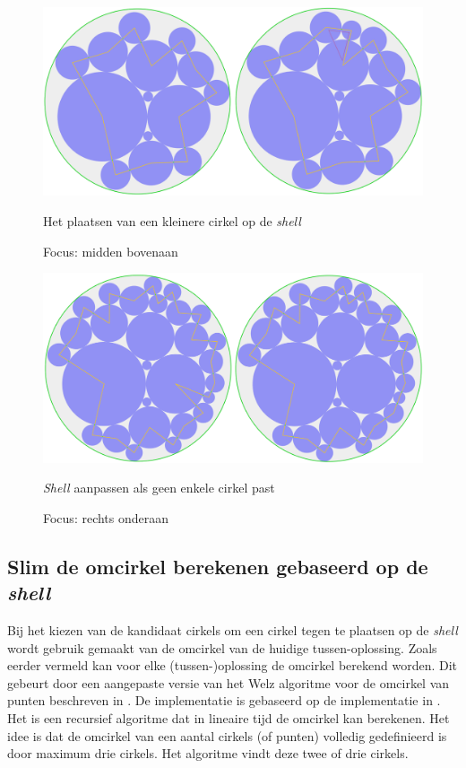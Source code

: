 \documentclass[12pt,a4paper,oneside]{book}
\begin{document}
\begin{figure}
  \centering
  \includegraphics[width=1.0\textwidth]{plaats-op-shell-kleiner.png}
  \caption{Het plaatsen van een kleinere cirkel op de \textit{shell}} \label{fig:plaats-op-shell-kleiner} 
  \caption*{Focus: midden bovenaan}
\end{figure}

\begin{figure}
  \centering
  \includegraphics[width=1.0\textwidth]{plaats-op-shell-geen-enkele-past.png}
  \caption{\textit{Shell} aanpassen als geen enkele cirkel past} \label{fig:plaats-op-shell-geen-enkele-past} 
  \caption*{Focus: rechts onderaan}
\end{figure}

\subsection{Slim de omcirkel berekenen gebaseerd op de \textit{shell}}

Bij het kiezen van de kandidaat cirkels om een cirkel tegen te plaatsen op de \textit{shell} wordt gebruik gemaakt van de omcirkel van de huidige tussen-oplossing.
Zoals eerder vermeld kan voor elke (tussen-)oplossing de omcirkel berekend worden.
Dit gebeurt door een aangepaste versie van het Welz algoritme voor de omcirkel van punten beschreven in \cite{welzl1991smallest}.
De implementatie is gebaseerd op de implementatie in \cite{sunshine2008welzl}.
Het is een recursief algoritme dat in lineaire tijd de omcirkel kan berekenen.
Het idee is dat de omcirkel van een aantal cirkels (of punten) volledig gedefinieerd is door maximum drie cirkels.
Het algoritme vindt deze twee of drie cirkels.
\end{document}
